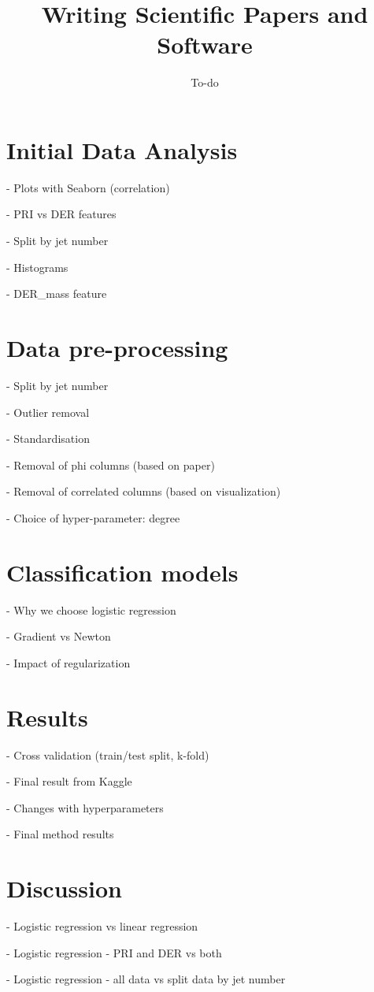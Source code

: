 \documentclass[10pt,conference,compsocconf]{IEEEtran}
\begin{document}
\title{Writing Scientific Papers and Software}

\author{
  To-do
}

\maketitle

\begin{abstract}
  
\end{abstract}

\section{Initial Data Analysis}

- Plots with Seaborn (correlation)

	- PRI vs DER features
	
	- Split by jet number
	
- Histograms

	- DER\_mass feature
	
\section{Data pre-processing}

- Split by jet number

- Outlier removal

- Standardisation

- Removal of phi columns (based on paper)

- Removal of correlated columns (based on visualization)

- Choice of hyper-parameter: degree

\section{Classification models}

- Why we choose logistic regression

- Gradient vs Newton

- Impact of regularization

\section{Results}

- Cross validation (train/test split, k-fold)

- Final result from Kaggle

- Changes with hyperparameters

- Final method results 

\section{Discussion}

- Logistic regression vs linear regression

- Logistic regression - PRI and DER vs both

- Logistic regression - all data vs split data by jet number

%
%
\end{document}
